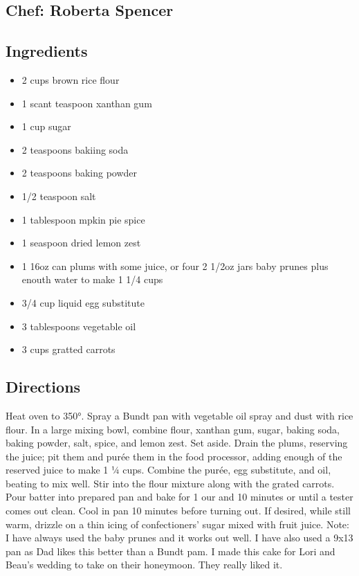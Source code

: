 \documentclass[
]{book}
\providecommand{\tightlist}{%
  \setlength{\itemsep}{0pt}\setlength{\parskip}{0pt}}
\begin{document}
\hypertarget{chef-roberta-spencer-29}{%
\subsection*{Chef: Roberta Spencer}\label{chef-roberta-spencer-29}}


\hypertarget{ingredients-83}{%
\subsection*{Ingredients}\label{ingredients-83}}


\begin{itemize}
\tightlist
\item
  2 cups brown rice flour
\item
  1 scant teaspoon xanthan gum
\item
  1 cup sugar
\item
  2 teaspoons bakiing soda
\item
  2 teaspoons baking powder
\item
  1/2 teaspoon salt
\item
  1 tablespoon mpkin pie spice
\item
  1 seaspoon dried lemon zest
\item
  1 16oz can plums with some juice, or four 2 1/2oz jars baby prunes plus enouth water to make 1 1/4 cups
\item
  3/4 cup liquid egg substitute
\item
  3 tablespoons vegetable oil
\item
  3 cups gratted carrots
\end{itemize}

\hypertarget{directions-83}{%
\subsection*{Directions}\label{directions-83}}


Heat oven to 350°. Spray a Bundt pan with vegetable oil spray and dust with rice flour. In a large mixing bowl, combine flour, xanthan gum, sugar, baking soda, baking powder, salt, spice, and lemon zest. Set aside. Drain the plums, reserving the juice; pit them and purée them in the food processor, adding enough of the reserved juice to make 1 ¼ cups. Combine the purée, egg substitute, and oil, beating to mix well. Stir into the flour mixture along with the grated carrots. Pour batter into prepared pan and bake for 1 our and 10 minutes or until a tester comes out clean. Cool in pan 10 minutes before turning out. If desired, while still warm, drizzle on a thin icing of confectioners' sugar mixed with fruit juice. Note: I have always used the baby prunes and it works out well. I have also used a 9x13 pan as Dad likes this better than a Bundt pam. I made this cake for Lori and Beau's wedding to take on their honeymoon. They really liked it.
\end{document}
